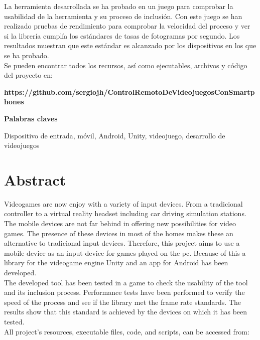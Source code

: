 La herramienta desarrollada se ha probado en un juego para comprobar la usabilidad de la herramienta y su proceso de inclusi\'on. Con este juego se han realizado pruebas de rendimiento para comprobar la velocidad del proceso y ver si la librer\'ia cumpl\'ia los est\'andares de tasas de fotogramas por segundo. Los resultados muestran que este est\'andar es alcanzado por los dispositivos en los que se ha probado.\\

Se pueden encontrar todos los recursos, as\'i como ejecutables, archivos y c\'odigo del proyecto en:\\
\scriptsize

\textbf{https://github.com/sergiojh/ControlRemotoDeVideojuegosConSmartphones}

\normalsize

\addvspace{1cm}


\Large{\textbf{Palabras claves}}
\normalsize

\addvspace{1cm}

Dispositivo de entrada, m\'ovil, Android, Unity, videojuego, desarrollo de videojuegos


\chapter{Abstract}

Videogames are now enjoy with a variety of input devices. From a tradicional controller to a virtual reality headset including car driving simulation stations. The mobile devices are not far behind in offering new possibilities for video games. The presence of these devices in most of the homes makes these an alternative to tradicional input devices. Therefore, this project aims to use a mobile device as an input device for games played on the pc. Because of this a library for the videogame engine Unity and an app for Android has been developed.\\

The developed tool has been tested in a game to check the usability of the tool and its inclusion process. Performance tests have been performed to verify the speed of the process and see if the library met the frame rate standards. The results show that this standard is achieved by the devices on which it has been tested.\\

All project's resources, executable files, code, and scripts, can be accessed from:\\

